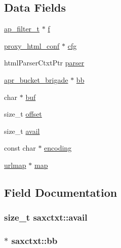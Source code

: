 \subsection*{Data Fields}
\begin{DoxyCompactItemize}
\item 
\hyperlink{structap__filter__t}{ap\+\_\+filter\+\_\+t} $\ast$ \hyperlink{structsaxctxt_a1e60da3e58f80857bfffdce3fc9c559b}{f}
\item 
\hyperlink{structproxy__html__conf}{proxy\+\_\+html\+\_\+conf} $\ast$ \hyperlink{structsaxctxt_a0d60bad4e637f5ea3c32b352544cc17b}{cfg}
\item 
html\+Parser\+Ctxt\+Ptr \hyperlink{structsaxctxt_a1414b1835a9ed6beb32635536f9f513a}{parser}
\item 
\hyperlink{structapr__bucket__brigade}{apr\+\_\+bucket\+\_\+brigade} $\ast$ \hyperlink{structsaxctxt_a9ce7d75135c0499955b98061ecefcdcf}{bb}
\item 
char $\ast$ \hyperlink{structsaxctxt_a4dfdebf0a3ebfca7befd156c135b3f0a}{buf}
\item 
size\+\_\+t \hyperlink{structsaxctxt_a19e878a53d5fe29146d7e9407ebf02cd}{offset}
\item 
size\+\_\+t \hyperlink{structsaxctxt_a70efcde77ea4b56738757af60d3b6500}{avail}
\item 
const char $\ast$ \hyperlink{structsaxctxt_a33eba5200ec03a6fb1ee6f0985c0620e}{encoding}
\item 
\hyperlink{structurlmap}{urlmap} $\ast$ \hyperlink{structsaxctxt_aa47779a6fd6a2e06539689ff148fdc66}{map}
\end{DoxyCompactItemize}


\subsection{Field Documentation}
\subsubsection[{\texorpdfstring{avail}{avail}}]{\setlength{\rightskip}{0pt plus 5cm}size\+\_\+t saxctxt\+::avail}\hypertarget{structsaxctxt_a70efcde77ea4b56738757af60d3b6500}{}\label{structsaxctxt_a70efcde77ea4b56738757af60d3b6500}
\subsubsection[{\texorpdfstring{bb}{bb}}]{$\ast$ saxctxt\+::bb}\hypertarget{structsaxctxt_a9ce7d75135c0499955b98061ecefcdcf}{}\label{structsaxctxt_a9ce7d75135c0499955b98061ecefcdcf}
